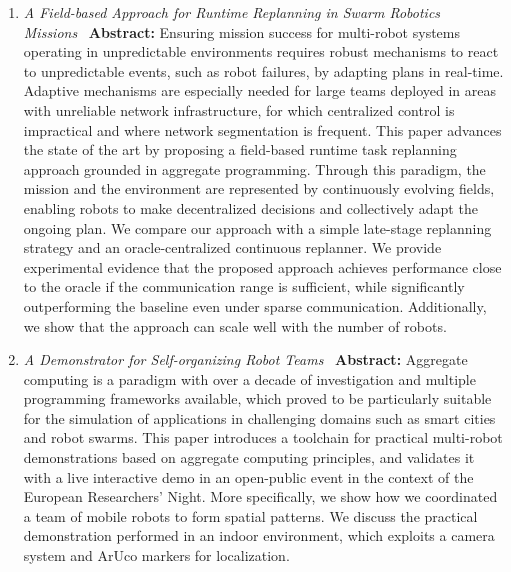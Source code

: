 \documentclass[runningheads]{llncs}
\begin{document}
    \begin{enumerate}
        \item \emph{A Field-based Approach for Runtime Replanning in Swarm Robotics Missions}~\cite{DBLP:conf/acsos/AguzziBCMPPV25}\label{paper:acsos25}
        \textbf{Abstract:}
        Ensuring mission success for multi-robot systems operating
        in unpredictable environments requires robust mechanisms to react to unpredictable events,
            such as robot failures,
            by adapting plans in real-time.
            Adaptive mechanisms are especially needed for large teams deployed in areas with unreliable network infrastructure,
            for which centralized control is impractical and where network segmentation is frequent.
            This paper advances the state of the art by proposing a field-based runtime task replanning approach grounded in aggregate programming.
            Through this paradigm,
            the mission and the environment are represented by continuously evolving fields,
            enabling robots to make decentralized decisions
            and collectively adapt the ongoing plan.
            We compare our approach with a simple late-stage replanning strategy
            and an oracle-centralized continuous replanner.
            We provide experimental evidence that
            the proposed approach achieves performance close to the oracle if the communication range is sufficient,
            while significantly outperforming the baseline even under sparse communication.
            Additionally, we show that the approach can scale well with the number of robots.

        \item \emph{A Demonstrator for Self-organizing Robot Teams}~\cite{DBLP:conf/coordination/AguzziBBCCDFPV25}\label{paper:coordination25}
        \textbf{Abstract:}
            Aggregate computing is a paradigm with over a decade of investigation and multiple programming frameworks available,
            which proved to be particularly suitable for the simulation of applications in challenging domains such as smart cities and robot swarms.
            This paper introduces a toolchain for practical multi-robot demonstrations based on aggregate computing principles,
            and validates it with a live interactive demo in an open-public event in the context of the European Researchers’ Night.
            More specifically,
            we show how we coordinated a team of mobile robots to form spatial patterns.
            We discuss the practical demonstration performed in an indoor environment,
            which exploits a camera system and ArUco markers for localization.
    \end{enumerate}
\end{document}
